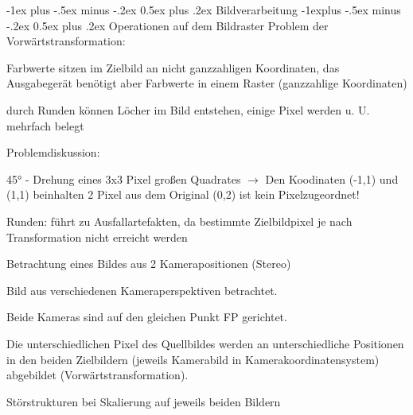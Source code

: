 \documentclass[landscape]{article}
\makeatletter
\renewcommand{\section}{\@startsection{section}{1}{0mm}%
                                {-1ex plus -.5ex minus -.2ex}%
                                {0.5ex plus .2ex}%
                                {\normalfont\large\bfseries}}
\renewcommand{\subsection}{\@startsection{subsection}{2}{0mm}%
                                {-1explus -.5ex minus -.2ex}%
                                {0.5ex plus .2ex}%
                                {\normalfont\normalsize\bfseries}}
\makeatother
\begin{document}
\begin{multicols}{3}
  
  \section{Bildverarbeitung}
  \subsection{Operationen auf dem Bildraster}
  Problem der Vorwärtstransformation:
  \begin{itemize*}
    \item Farbwerte sitzen im Zielbild an nicht ganzzahligen Koordinaten, das Ausgabegerät benötigt aber Farbwerte in einem Raster (ganzzahlige Koordinaten)
    \item durch Runden können Löcher im Bild entstehen, einige Pixel werden u. U. mehrfach belegt
  \end{itemize*}
  
  
  Problemdiskussion: 
  \begin{itemize*}
    \item 45° - Drehung eines 3x3 Pixel großen Quadrates $\rightarrow$ Den Koodinaten (-1,1) und (1,1) beinhalten 2 Pixel aus dem Original (0,2) ist kein Pixelzugeordnet!
    \item Runden: führt zu Ausfallartefakten, da bestimmte Zielbildpixel je nach Transformation nicht erreicht werden
    \item Betrachtung eines Bildes aus 2 Kamerapositionen (Stereo)
    \begin{itemize*}
      \item Bild aus verschiedenen Kameraperspektiven betrachtet.
      \item Beide Kameras sind auf den gleichen Punkt FP gerichtet.
      \item Die unterschiedlichen Pixel des Quellbildes werden an unterschiedliche Positionen in den beiden Zielbildern (jeweils Kamerabild in Kamerakoordinatensystem) abgebildet (Vorwärtstransformation).
      \item Störstrukturen bei Skalierung auf jeweils beiden Bildern
    \end{itemize*}
  \end{itemize*}
  

\end{multicols}
\end{document}
